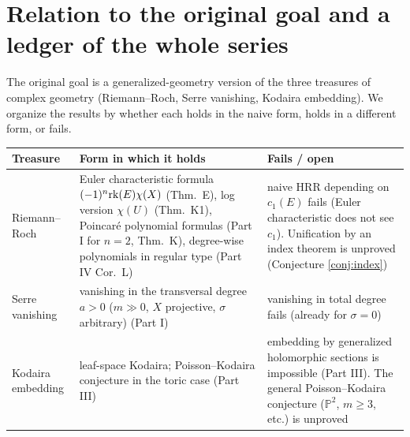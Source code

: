 \section{Relation to the original goal and a ledger of the whole series}\label{sec:ledger}
The original goal is a generalized-geometry version of the three treasures of complex geometry (Riemann--Roch, Serre vanishing, Kodaira embedding). We organize the results by whether each holds in the naive form, holds in a different form, or fails.

\begin{center}\small
\begin{tabular}{>{\raggedright\arraybackslash}p{2.6cm}>{\raggedright\arraybackslash}p{6.2cm}>{\raggedright\arraybackslash}p{6.0cm}}
\toprule Treasure & Form in which it holds & Fails / open\\\midrule
Riemann--Roch & Euler characteristic formula $(-1)^n\mathrm{rk}(E)\chi(X)$ (Thm.\ E), log version $\chi(U)$ (Thm.\ K1), Poincar\'e polynomial formulas (Part I for $n=2$, Thm.\ K), degree-wise polynomials in regular type (Part IV Cor.\ L) & naive HRR depending on $c_1(E)$ fails (Euler characteristic does not see $c_1$). Unification by an index theorem is unproved (Conjecture \ref{conj:index})\\\midrule
Serre vanishing & vanishing in the transversal degree $a>0$ ($m\gg0$, $X$ projective, $\sigma$ arbitrary) (Part I) & vanishing in total degree fails (already for $\sigma=0$)\\\midrule
Kodaira embedding & leaf-space Kodaira; Poisson--Kodaira conjecture in the toric case (Part III) & embedding by generalized holomorphic sections is impossible (Part III). The general Poisson--Kodaira conjecture ($\mathbb P^2$, $m\ge3$, etc.) is unproved\\\bottomrule
\end{tabular}
\end{center}

